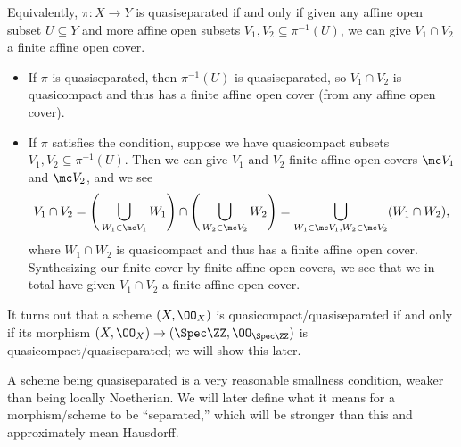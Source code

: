 \documentclass[../notes.tex]{subfiles}
\begin{document}
\begin{remark}
	Equivalently, $\pi\colon X\to Y$ is quasiseparated if and only if given any affine open subset $U\subseteq Y$ and more affine open subsets $V_1,V_2\subseteq\pi^{-1}(U)$, we can give $V_1\cap V_2$ a finite affine open cover.
	\begin{itemize}
		\item If $\pi$ is quasiseparated, then $\pi^{-1}(U)$ is quasiseparated, so $V_1\cap V_2$ is quasicompact and thus has a finite affine open cover (from any affine open cover).
		\item If $\pi$ satisfies the condition, suppose we have quasicompact subsets $V_1,V_2\subseteq\pi^{-1}(U)$. Then we can give $V_1$ and $V_2$ finite affine open covers $\mc V_1$ and $\mc V_2$, and we see
		\[V_1\cap V_2=\Bigg(\bigcup_{W_1\in\mc V_1}W_1\Bigg)\cap\Bigg(\bigcup_{W_2\in\mc V_2}W_2\Bigg)=\bigcup_{W_1\in\mc V_1,W_2\in\mc V_2}(W_1\cap W_2),\]
		where $W_1\cap W_2$ is quasicompact and thus has a finite affine open cover. Synthesizing our finite cover by finite affine open covers, we see that we in total have given $V_1\cap V_2$ a finite affine open cover.
	\end{itemize}
\end{remark}
It turns out that a scheme $(X,\OO_X)$ is quasicompact/quasiseparated if and only if its morphism $(X,\OO_X)\to(\Spec\ZZ,\OO_{\Spec\ZZ})$ is quasicompact/quasiseparated; we will show this later.
\begin{remark}
	A scheme being quasiseparated is a very reasonable smallness condition, weaker than being locally Noetherian. We will later define what it means for a morphism/scheme to be ``separated,'' which will be stronger than this and approximately mean Hausdorff.
\end{remark}
\end{document}
